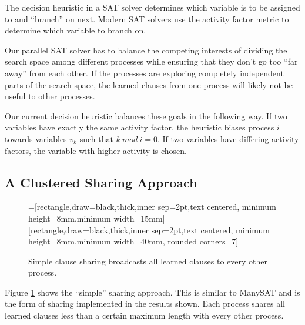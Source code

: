 \documentclass[letterpaper, compsoc, conference]{IEEEtran}
\begin{document}
The decision heuristic in a SAT solver determines which variable is to be
assigned to and ``branch'' on next. Modern SAT solvers use the activity factor
metric to determine which variable to branch on.

Our parallel SAT solver has to balance the competing interests of dividing the
search space among different processes while ensuring that they don't go too
``far away'' from each other. If the processes are exploring completely
independent parts of the search space, the learned clauses from one process
will likely not be useful to other processes. 

Our current decision heuristic balances these goals in the following way.  If
two variables have exactly the same activity factor, the heuristic biases
process $i$ towards variables $v_k$ such that $k~mod~i=0$. If two variables
have differing activity factors, the variable with higher activity is chosen.

\subsection{A Clustered Sharing Approach}

\begin{figure}[htbp]
    =[rectangle,draw=black,thick,inner sep=2pt,text centered,
                     minimum height=8mm,minimum width=15mm]
    =[rectangle,draw=black,thick,inner sep=2pt,text centered,
                        minimum height=8mm,minimum width=40mm, rounded corners=7]
    \begin{center}
    \end{center}
    \caption{Simple clause sharing broadcasts all learned clauses to every other process.}
    \label{fig:simple}
\end{figure}

Figure \ref{fig:simple} shows the ``simple'' sharing approach. This is similar
to ManySAT and is the form of sharing implemented in the results shown. Each
process shares all learned clauses less than a certain maximum length with
every other process.
\end{document}

